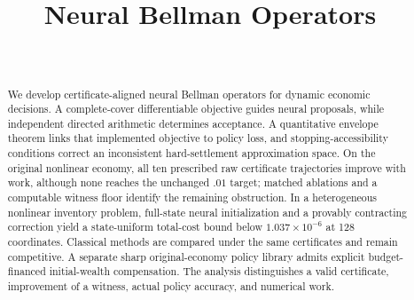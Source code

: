 \documentclass[ecta]{econsocart}
\theoremstyle{remark}
\begin{document}
\begin{frontmatter}
\title{Neural Bellman Operators}
\begin{aug}
\author[id=au1,addressref={add1}]{~}
\address[id=add1]{}
\end{aug}
\begin{abstract}
We develop certificate-aligned neural Bellman operators for dynamic economic decisions. A complete-cover differentiable objective guides neural proposals, while independent directed arithmetic determines acceptance. A quantitative envelope theorem links that implemented objective to policy loss, and stopping-accessibility conditions correct an inconsistent hard-settlement approximation space. On the original nonlinear economy, all ten prescribed raw certificate trajectories improve with work, although none reaches the unchanged $.01$ target; matched ablations and a computable witness floor identify the remaining obstruction. In a heterogeneous nonlinear inventory problem, full-state neural initialization and a provably contracting correction yield a state-uniform total-cost bound below $1.037\times10^{-6}$ at 128 coordinates. Classical methods are compared under the same certificates and remain competitive. A separate sharp original-economy policy library admits explicit budget-financed initial-wealth compensation. The analysis distinguishes a valid certificate, improvement of a witness, actual policy accuracy, and numerical work.
\end{abstract}
\begin{keyword}
\end{keyword}
\end{frontmatter}

\begin{appendix}



\end{appendix}
\clearpage

\end{document}
